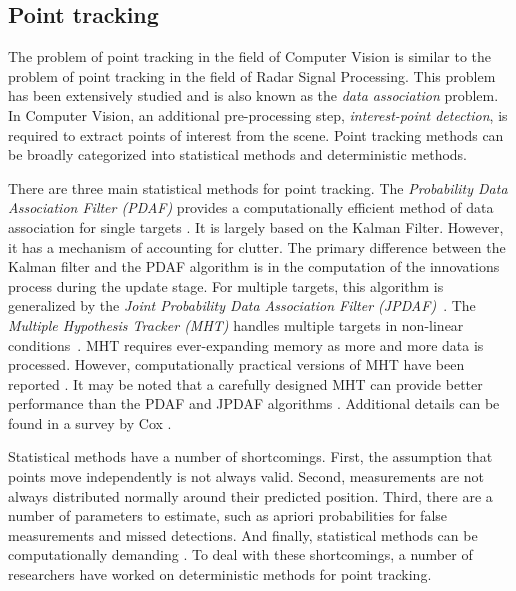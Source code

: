 \subsection{Point tracking}
The problem of point tracking in the field of Computer Vision is similar to the problem of point tracking in the field of Radar Signal Processing.  This problem has been extensively studied and is also known as the \emph{data association} problem.  In Computer Vision, an additional pre-processing step, \emph{interest-point detection}, is required to extract points of interest from the scene.  Point tracking methods can be broadly categorized into statistical methods and deterministic methods.

There are three main statistical methods for point tracking.  The \emph{Probability Data Association Filter (PDAF)} provides a computationally efficient method of data association for single targets \cite{1975_JNL_PDAF_BarShalom}.  It is largely based on the Kalman Filter.  However, it has a mechanism of accounting for clutter.  The primary difference between the Kalman filter and the PDAF algorithm is in the computation of the innovations process during the update stage.  For multiple targets, this algorithm is generalized by the \emph{Joint Probability Data Association Filter (JPDAF)}~\cite{1983_JNL_JPDAF_Fortmann}.  The \emph{Multiple Hypothesis Tracker (MHT)} handles multiple targets in non-linear conditions~\cite{1979_JNL_MTT_Reid}.  MHT requires ever-expanding memory as more and more data is processed.  However, computationally practical versions of MHT have been reported \cite{1996_JNL_EfficientMHT_Cox, 1994_CNF_MLPMHT_Streit}.  It may be noted that a carefully designed MHT can provide better performance than the PDAF and JPDAF algorithms \cite{2009_JNL_PDAF_Barshalom}.  Additional details can be found in a survey by Cox \cite{1993_JNL_SURVEYcorresp_Cox}.  

Statistical methods have a number of shortcomings.  First, the assumption that points move independently is not always valid.  Second, measurements are not always distributed normally around their predicted position.  Third, there are a number of parameters to estimate, such as apriori probabilities for false measurements and missed detections.  And finally, statistical methods can be computationally demanding \cite{2001_JNL_MotionCorrespondence_Veenman}.  To deal with these shortcomings, a number of researchers have worked on deterministic methods for point tracking.

